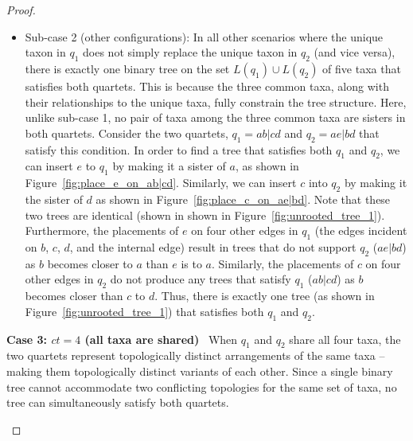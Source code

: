 \documentclass[10pt,a4paper]{article}
\begin{document}
\begin{proof}
\begin{itemize}
\begin{itemize}
    \item Sub-case 2 (other configurations): In all other scenarios where the unique taxon in $q_1$ does not simply replace the unique taxon in $q_2$ (and vice versa), there is exactly one binary tree on the set $L(q_1)\cup L(q_2)$ of five taxa that satisfies both quartets. This is because the three common taxa, along with their relationships to the unique taxa, fully constrain the tree structure. Here, unlike sub-case 1, no pair of taxa among the three common taxa are sisters in both quartets. Consider the two quartets, $q_1 = ab|cd$ and $q_2 =  ae|bd$ %
    that satisfy this condition. %
    In order to find a tree that satisfies both $q_1$ and $q_2$, we can insert $e$ to $q_1$ by making it a sister of $a$, as shown in Figure~\ref{fig:place_e_on_ab|cd}. Similarly, we can insert $c$ into $q_2$ by making it the sister of $d$ as shown in Figure~\ref{fig:place_c_on_ae|bd}. Note that these two trees are identical (shown in shown in Figure~\ref{fig:unrooted_tree_1}). Furthermore, the placements of $e$ on four other edges in $q_1$ (the edges incident on $b$, $c$, $d$, and the internal edge) result in trees that do not support $q_2$ ($ae|bd$) as $b$ becomes closer to $a$ than $e$ is to $a$. Similarly, the placements of $c$ on four other edges in $q_2$ do not produce any trees that satisfy $q_1$ ($ab|cd$) as  $b$ becomes closer than $c$ to $d$. Thus, there is exactly one tree (as shown in Figure~\ref{fig:unrooted_tree_1}) that satisfies both $q_1$ and $q_2$.


    \end{itemize}


\textbf{Case 3: $ct = 4$ (all taxa are shared)} \ When $q_1$ and $q_2$ share all four taxa, the two quartets represent topologically distinct arrangements of the same taxa -- making them topologically distinct variants of each other. Since a single binary tree cannot accommodate two conflicting topologies for the same set of taxa, no tree can simultaneously satisfy both quartets.

\end{itemize}

\end{proof}
\end{document}
